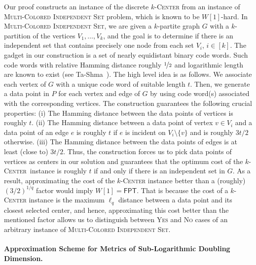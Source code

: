 \documentclass[11pt]{article}
\newcommand{\kc}{\textsc{$k$-Center}\xspace}
\newcommand{\fpt}{\textsf{FPT}\xspace}
\newcommand{\mcis}{\textsc{Multi-Colored Independent Set}\xspace}
\newcommand{\kcen}{\textsc{$k$-Center}}
\begin{document}
Our proof constructs an instance of the discrete \kc  from an instance of \mcis problem, which is known to be $W[1]$-hard. In \mcis, we are given a $k$-partite graph $G$ with a $k$-partition of the vertices $V_1,\dots,V_k$, and  the goal is to determine if there is an independent set that contains precisely one node from each set $V_i$, $i\in[k]$.  
The gadget in our construction is a set of nearly equidistant binary code words. Such code words with relative Hamming distance roughly $\nicefrac{1}{2}$ and logarithmic length are known to exist (see Ta-Shma~\cite{ta-shma17:explicit-balanced-codes}). The high level idea is as follows. We associate each vertex of $G$ with a unique code word of suitable length $t$.
Then, we generate a data point in $P$ for each vertex and edge of $G$ by using code word(s) associated with the corresponding vertices. The construction guarantees the following crucial properties: (i) The Hamming distance between the data points of vertices is roughly $t$. (ii) The Hamming distance between 
a data point of vertex $v \in V_i$ and a data point of an edge $e$ is  roughly $t$ if $e$ is incident on $V_i \setminus \{v\}$ and is roughly $3t/2$ otherwise.
(iii) The Hamming distance between the data points of edges is at least (close to) $3t/2$. Thus, the construction forces us to pick data points of vertices as centers in our solution and guarantees that the optimum cost of the \kcen~instance is roughly $t$ if and only if there is an independent set in $G$. As a result, approximating the cost of the \kc instance better than a (roughly) $(3 / 2)^{1 / q}$ factor would imply $W[1] = \fpt$. That is because the cost of a \kc instance is the maximum $\ell_q$ distance between a data point and its closest selected center, and hence, approximating this cost better than the mentioned factor allows us to distinguish between \textsc{Yes} and \textsc{No} cases of an arbitrary instance of \mcis.

\paragraph*{Approximation Scheme for Metrics of Sub-Logarithmic Doubling Dimension.} 
\end{document}
